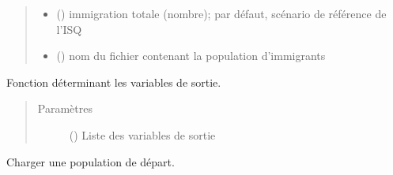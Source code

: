 \documentclass[letterpaper,10pt,french]{sphinxmanual}
\begin{document}
\begin{fulllineitems}
\begin{fulllineitems}
\begin{quote}
\begin{description}
\begin{itemize}
\item {} 
 () \textendash{} immigration totale (nombre); par défaut, scénario de référence de l’ISQ

\item {} 
 () \textendash{} nom du fichier contenant la population d’immigrants

\end{itemize}

\end{description}\end{quote}

\end{fulllineitems}


\begin{fulllineitems}
\label{\detokenize{code:simgen.model.set_statistics}}
Fonction déterminant les variables de sortie.
\begin{quote}\begin{description}
\item[{Paramètres}] \leavevmode
{} () \textendash{} Liste des variables de sortie

\end{description}\end{quote}

\end{fulllineitems}


\begin{fulllineitems}
\label{\detokenize{code:simgen.model.startpop}}
Charger une population de départ.


\end{fulllineitems}
\end{fulllineitems}
\end{document}
